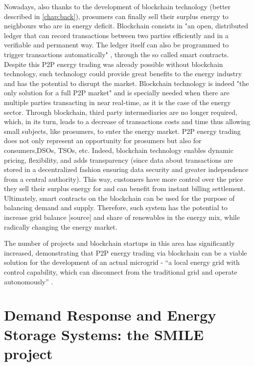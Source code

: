 Nowadays, also thanks to the development of blockchain technology (better described in \cref{chap:back}), prosumers can finally sell their surplus energy to neighbours who are in energy deficit. Blockchain consists in "an open, distributed ledger that can record transactions between two parties efficiently and in a verifiable and permanent way. The ledger itself can also be programmed to trigger transactions automatically" \cite{TruthBlockchain}, through the so called smart contracts. Despite this \ac{P2P} energy trading was already possible without blockchain technology, such technology could provide great benefits to the energy industry and has the potential to disrupt the market. Blockchain technology is indeed "the only solution for a full \ac{P2P} market" \cite{Powerledger} and is specially needed when there are multiple parties transacting in near real-time, as it is the case of the energy sector. Through blockchain, third party intermediaries are no longer required, which, in its turn, leads to a decrease of transactions costs and time thus allowing small subjects, like prosumers, to enter the energy market.
\ac{P2P} energy trading does not only represent an opportunity for prosumers but also for consumers,\acp{DSO}, \acp{TSO}, etc. Indeed, blockchain technology enables dynamic pricing, flexibility, and adds transparency (since data about transactions are stored in a decentralized fashion ensuring data security and greater independence from a central authority). This way, customers have more control over the price they sell their surplus energy for and can benefit from instant billing settlement. Ultimately, smart contracts on the blockchain can be used for the purpose of balancing demand and supply. Therefore, such system has the potential to increase grid balance [source] and share of renewables in the energy mix, while radically changing the energy market.



The number of projects and blockchain startups in this area has significantly increased, demonstrating that \ac{P2P} energy trading via blockchain can be a viable solution for the development of an actual microgrid - “a local energy grid with control capability, which can disconnect from the traditional grid and operate autonomously” \cite{HowMicrogridWorks}.


\section{Demand Response and Energy Storage Systems: the SMILE project}

